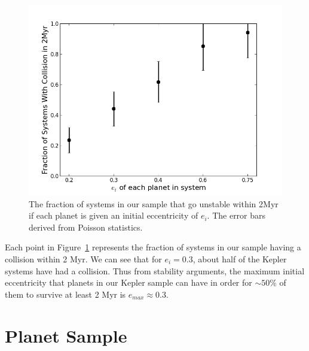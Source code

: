 \begin{figure}
\centerline{\includegraphics[trim=0cm 0cm 0.5cm 0.5cm, scale=0.48]{appendix/e_max_dyn.png}}
\caption{The fraction of \kep{} systems in our sample that go unstable within 2Myr if each planet is given an initial eccentricity of $e_i$. The error bars derived from Poisson statistics.}
\label{fig:emax_dyn}
\end{figure}

Each point in Figure~\ref{fig:emax_dyn} represents the fraction of systems in our sample having a collision within 2 Myr.
We can see that for $e_i = 0.3$, about half of the Kepler systems have had a collision. 
Thus from stability arguments, the maximum initial eccentricity that planets in our Kepler sample can have in order for $\sim 50\%$ of them to survive at least 2 Myr is $e_{max} \approx 0.3$.  

\onecolumn
\newpage
\section{Planet Sample}

